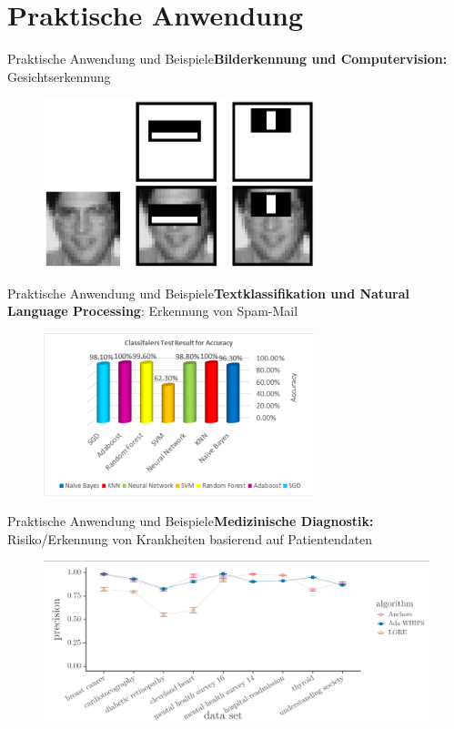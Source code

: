 \documentclass[hyperref={bookmarks=false},11pt,dvipsnames]{beamer}
\begin{document}
\section{Praktische Anwendung}
\begin{frame}{Praktische Anwendung und Beispiele}{\textbf{Bilderkennung und Computervision:} Gesichtserkennung}
	\begin{figure}
		\centering
		\includegraphics[width=0.7\textwidth]{../Ausarbeitung/figures/CV_Example.png}
	\end{figure}
\end{frame}
\begin{frame}{Praktische Anwendung und Beispiele}{\textbf{Textklassifikation und Natural Language Processing}: Erkennung von Spam-Mail}
	\begin{figure}
		\centering
		\includegraphics[width=0.7\textwidth]{../Ausarbeitung/figures/spam.png}
	\end{figure}
\end{frame}
\begin{frame}{Praktische Anwendung und Beispiele}{\textbf{Medizinische Diagnostik:} Risiko/Erkennung von Krankheiten basierend auf Patientendaten}
	\begin{figure}
		\centering
		\includegraphics[width=\textwidth]{../Ausarbeitung/figures/ada-whips.png}
	\end{figure}
\end{frame}
\end{document}
